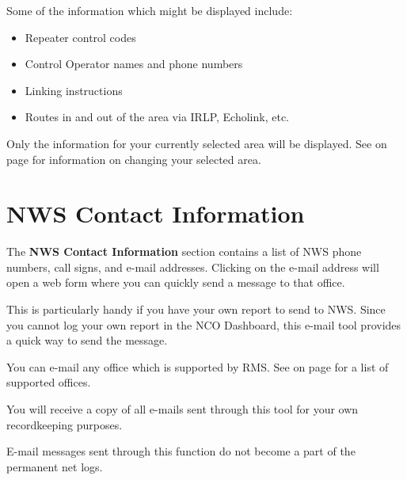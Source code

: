 \documentclass[pdflatex,letterpaper,twoside,12pt]{book}
\begin{document}
Some of the information which might be displayed include:

\begin{itemize}
\item Repeater control codes
\item Control Operator names and phone numbers
\item Linking instructions
\item Routes in and out of the area via IRLP, Echolink, etc.
\end{itemize}

Only the information for your currently selected area will be displayed.  See  on page \pageref{dash-set-area} for information on changing your selected area.



\section{NWS Contact Information}\label{dash-send-email}

The \textbf{NWS Contact Information} section contains a list of NWS phone numbers, call signs, and e-mail addresses.  Clicking on the e-mail address will open a web form where you can quickly send a message to that office.

This is particularly handy if you have your own report to send to NWS.  Since you cannot log your own report in the NCO Dashboard, this e-mail tool provides a quick way to send the message.

You can e-mail any office which is supported by RMS.  See  on page \pageref{rms-offices} for a list of supported offices.

You will receive a copy of all e-mails sent through this tool for your own recordkeeping purposes.

E-mail messages sent through this function do not become a part of the permanent net logs.

\end{document}
